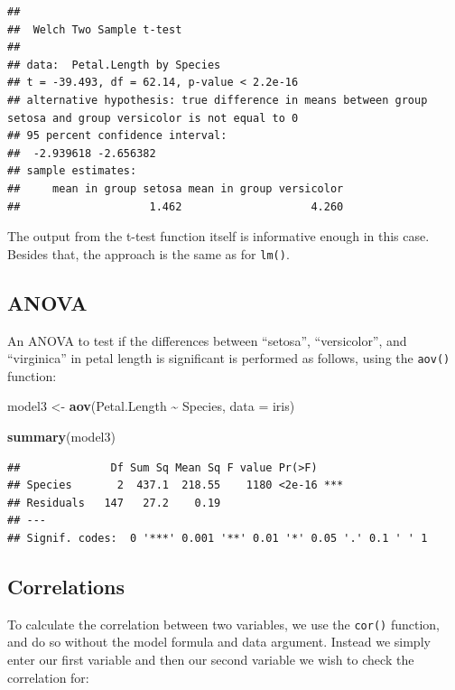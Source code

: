 \documentclass[
]{book}
\newenvironment{Shaded}{\begin{snugshade}}{\end{snugshade}}
\newcommand{\AttributeTok}[1]{\textcolor[rgb]{0.13,0.29,0.53}{#1}}
\newcommand{\FunctionTok}[1]{\textcolor[rgb]{0.13,0.29,0.53}{\textbf{#1}}}
\newcommand{\NormalTok}[1]{#1}
\newcommand{\OtherTok}[1]{\textcolor[rgb]{0.56,0.35,0.01}{#1}}
\newcommand{\SpecialCharTok}[1]{\textcolor[rgb]{0.81,0.36,0.00}{\textbf{#1}}}
\begin{document}
\begin{verbatim}
## 
##  Welch Two Sample t-test
## 
## data:  Petal.Length by Species
## t = -39.493, df = 62.14, p-value < 2.2e-16
## alternative hypothesis: true difference in means between group setosa and group versicolor is not equal to 0
## 95 percent confidence interval:
##  -2.939618 -2.656382
## sample estimates:
##     mean in group setosa mean in group versicolor 
##                    1.462                    4.260
\end{verbatim}

The output from the t-test function itself is informative enough in this case. Besides that, the approach is the same as for \texttt{lm()}.

\subsection{ANOVA}\label{anova}

An ANOVA to test if the differences between ``setosa'', ``versicolor'', and ``virginica'' in petal length is significant is performed as follows, using the \texttt{aov()} function:

\begin{Shaded}
\begin{Highlighting}[]
\NormalTok{model3 }\OtherTok{\textless{}{-}} \FunctionTok{aov}\NormalTok{(Petal.Length }\SpecialCharTok{\textasciitilde{}}\NormalTok{ Species, }\AttributeTok{data =}\NormalTok{ iris)}

\FunctionTok{summary}\NormalTok{(model3)}
\end{Highlighting}
\end{Shaded}

\begin{verbatim}
##              Df Sum Sq Mean Sq F value Pr(>F)    
## Species       2  437.1  218.55    1180 <2e-16 ***
## Residuals   147   27.2    0.19                   
## ---
## Signif. codes:  0 '***' 0.001 '**' 0.01 '*' 0.05 '.' 0.1 ' ' 1
\end{verbatim}

\subsection{Correlations}\label{correlations}

To calculate the correlation between two variables, we use the \texttt{cor()} function, and do so without the model formula and data argument. Instead we simply enter our first variable and then our second variable we wish to check the correlation for:
\end{document}
